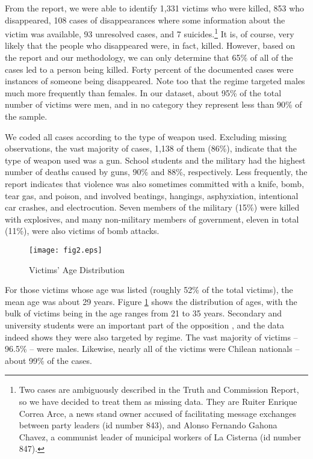 \documentclass[a4paper,12pt]{article}
\begin{document}
From the report, we were able to identify 1,331 victims who were killed, 853 who disappeared, 108 cases of disappearances where some information about the victim was available, 93 unresolved cases, and 7 suicides.\footnote{Two cases are ambiguously described in the Truth and Commission Report, so we have decided to treat them as missing data. They are Ruiter Enrique Correa Arce, a news stand owner accused of facilitating message exchanges between party leaders (id number 843), and Alonso Fernando Gahona Chavez, a communist leader of municipal workers of La Cisterna (id number 847).} It is, of course, very likely that the people who disappeared were, in fact, killed. However, based on the report and our methodology, we can only determine that 65\% of all of the cases led to a person being killed. Forty percent of the documented cases were instances of someone being disappeared. Note too that the regime targeted males much more frequently than females. In our dataset, about 95\% of the total number of victims were men, and in no category they represent less than 90\% of the sample.

We coded all cases according to the type of weapon used. Excluding missing observations, the vast majority of cases, 1,138 of them (86\%), indicate that the type of weapon used was a gun. School students and the military had the highest number of deaths caused by guns, 90\% and 88\%, respectively. Less frequently, the report indicates that violence was also sometimes committed with a knife, bomb, tear gas, and poison, and involved beatings, hangings, asphyxiation, intentional car crashes, and electrocution. Seven members of the military (15\%) were killed with explosives, and many non-military members of government, eleven in total (11\%), were also victims of bomb attacks.

\begin{figure}[ht!]
    \centering
    \texttt{[image: fig2.eps]}
    \caption{Victims' Age Distribution}
    \label{fig:victim-age}
\end{figure}


For those victims whose age was listed (roughly 52\% of the total victims), the mean age was about 29 years. Figure \ref{fig:victim-age} shows the distribution of ages, with the bulk of victims being in the age ranges from 21 to 35 years. Secondary and university students were an important part of the opposition \citep[251]{guzman2012students,huneeus2016oposicion}, and the data indeed shows they were also targeted by regime. The vast majority of victims -- 96.5\% -- were males. Likewise, nearly all of the victims were Chilean nationals -- about 99\% of the cases.
\end{document}
